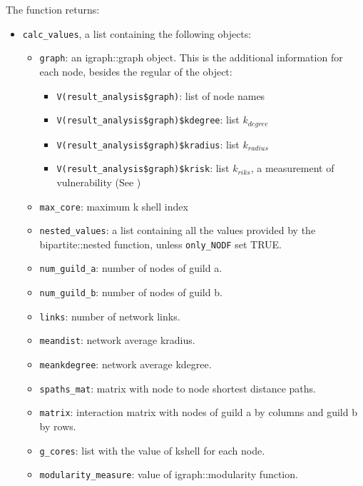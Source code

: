 \documentclass[11pt]{article}
\begin{document}
The function returns:
\begin{itemize}
\item \texttt{calc\_values}, a list containing the following objects:
   \begin{itemize}
   
\item \texttt{graph}: an igraph::graph object. This is the additional information for each node, besides the regular of the object:
	\begin{itemize}
    	\item \texttt{V(result\_analysis\$graph)}: list of node names
		\item \texttt{V(result\_analysis\$graph)\$kdegree}: list $k_{degree}$
		\item \texttt{V(result\_analysis\$graph)\$kradius}: list $k_{radius}$
		\item \texttt{V(result\_analysis\$graph)\$krisk}: list $k_{riks}$, a measurement of vulnerability (See \cite{Garcia-Algarra2017})
	\end{itemize}
\item \texttt{max\_core}: maximum k shell index

\item \texttt{nested\_values}: a list containing all the values provided by the bipartite::nested function, unless \texttt{only\_NODF} set TRUE.

\item \texttt{num\_guild\_a}: number of nodes of guild a.

\item \texttt{num\_guild\_b}: number of nodes of guild b.

\item \texttt{links}: number of network links.

\item \texttt{meandist}: network average kradius.

\item \texttt{meankdegree}: network average kdegree.

\item \texttt{spaths\_mat}: matrix with node to node shortest distance paths.

\item \texttt{matrix}: interaction matrix with nodes of guild a by columns and guild b by rows.

\item \texttt{g\_cores}: list with the value of kshell for each node.

\item \texttt{modularity\_measure}: value of igraph::modularity function.
   \end{itemize}


\end{itemize}
\end{document}
